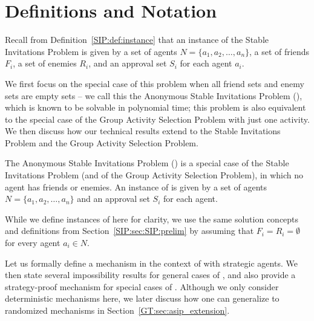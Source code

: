 \section{Definitions and Notation} \label{GT:sec:prelim}

Recall from Definition~\ref{SIP:def:instance} that an instance of the Stable Invitations Problem is given by a set of agents $N = \{a_1, a_2, \dots, a_n\}$, a set of friends $F_i$, a set of enemies $R_i$, and an approval set $S_i$ for each agent $a_i$.

We first focus on the special case of this problem when all friend sets and enemy sets are empty sets -- we call this the Anonymous Stable Invitations Problem (\ASIP), which is known to be solvable in polynomial time; this problem is also equivalent to the special case of the Group Activity Selection Problem with just one activity. We then discuss how our technical results extend to the Stable Invitations Problem and the Group Activity Selection Problem.

\begin{definition}
	The Anonymous Stable Invitations Problem (\ASIP) is a special case of the Stable Invitations Problem (and of the Group Activity Selection Problem), in which no agent has friends or enemies. An instance of \ASIPs is given by a set of agents $N = \{a_1, a_2, \dots, a_n\}$ and an approval set $S_i$ for each agent.
\end{definition}

While we define instances of \ASIPs here for clarity, we use the same solution concepts and definitions from Section~\ref{SIP:sec:SIP:prelim} by assuming that $F_i = R_i = \emptyset$ for every agent $a_i\in N$. 


Let us formally define a mechanism in the context of \ASIPs with strategic agents. We then state several impossibility results for general cases of \ASIP, and also provide a strategy-proof mechanism for special cases of \ASIP.  Although we only consider deterministic mechanisms here, we later discuss how one can generalize to randomized mechanisms in Section~\ref{GT:sec:asip_extension}.

